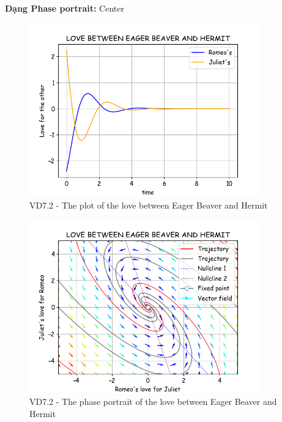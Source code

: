 \textbf{Dạng Phase portrait: } Center
\pagebreak
\begin{figure}[!htbp]
    \centering
    \includegraphics[width=100mm]{image/bt2/plot7.2.png}
    \caption{VD7.2 - The plot of the love between Eager Beaver and Hermit}
\end{figure}
\begin{figure}[!htbp]
    \centering
    \includegraphics[width=100mm]{image/bt2/pp7.2.png}
    \caption{VD7.2 - The phase portrait of the love between Eager Beaver and Hermit}
\end{figure}

